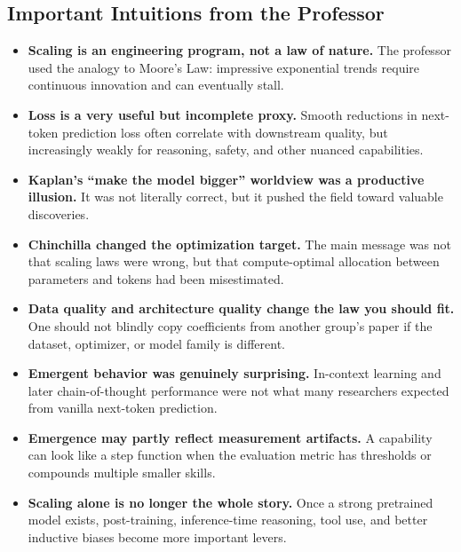 \documentclass[11pt]{article}
\begin{document}
\subsection{Important Intuitions from the Professor}
\begin{itemize}
    \item \textbf{Scaling is an engineering program, not a law of nature.} The professor used the analogy to Moore's Law: impressive exponential trends require continuous innovation and can eventually stall.
    \item \textbf{Loss is a very useful but incomplete proxy.} Smooth reductions in next-token prediction loss often correlate with downstream quality, but increasingly weakly for reasoning, safety, and other nuanced capabilities.
    \item \textbf{Kaplan's ``make the model bigger'' worldview was a productive illusion.} It was not literally correct, but it pushed the field toward valuable discoveries.
    \item \textbf{Chinchilla changed the optimization target.} The main message was not that scaling laws were wrong, but that compute-optimal allocation between parameters and tokens had been misestimated.
    \item \textbf{Data quality and architecture quality change the law you should fit.} One should not blindly copy coefficients from another group's paper if the dataset, optimizer, or model family is different.
    \item \textbf{Emergent behavior was genuinely surprising.} In-context learning and later chain-of-thought performance were not what many researchers expected from vanilla next-token prediction.
    \item \textbf{Emergence may partly reflect measurement artifacts.} A capability can look like a step function when the evaluation metric has thresholds or compounds multiple smaller skills.
    \item \textbf{Scaling alone is no longer the whole story.} Once a strong pretrained model exists, post-training, inference-time reasoning, tool use, and better inductive biases become more important levers.
\end{itemize}
\end{document}
